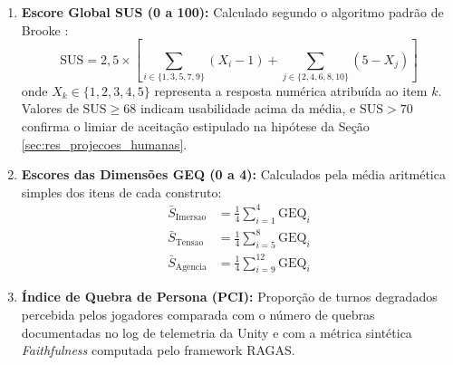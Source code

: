 \begin{enumerate}[noitemsep, topsep=2pt, parsep=1pt]
    \item \textbf{Escore Global SUS (0 a 100):} Calculado segundo o algoritmo padrão de Brooke \cite{brooke1996sus}:
    \begin{equation}
        \text{SUS} = 2{,}5 \times \left[ \sum_{i \in \{1,3,5,7,9\}} (X_i - 1) + \sum_{j \in \{2,4,6,8,10\}} (5 - X_j) \right]
    \end{equation}
    onde $X_k \in \{1, 2, 3, 4, 5\}$ representa a resposta numérica atribuída ao item $k$. Valores de $\text{SUS} \ge 68$ indicam usabilidade acima da média, e $\text{SUS} > 70$ confirma o limiar de aceitação estipulado na hipótese da Seção \ref{sec:res_projecoes_humanas}.

    \item \textbf{Escores das Dimensões GEQ (0 a 4):} Calculados pela média aritmética simples dos itens de cada construto:
    \begin{align}
        \bar{S}_{\text{Imersao}} &= \frac{1}{4} \sum_{i=1}^4 \text{GEQ}_i \\
        \bar{S}_{\text{Tensao}} &= \frac{1}{4} \sum_{i=5}^8 \text{GEQ}_i \\
        \bar{S}_{\text{Agencia}} &= \frac{1}{4} \sum_{i=9}^{12} \text{GEQ}_i
    \end{align}

    \item \textbf{Índice de Quebra de Persona (PCI):} Proporção de turnos degradados percebida pelos jogadores comparada com o número de quebras documentadas no log de telemetria da Unity e com a métrica sintética \textit{Faithfulness} computada pelo framework RAGAS.
\end{enumerate}

